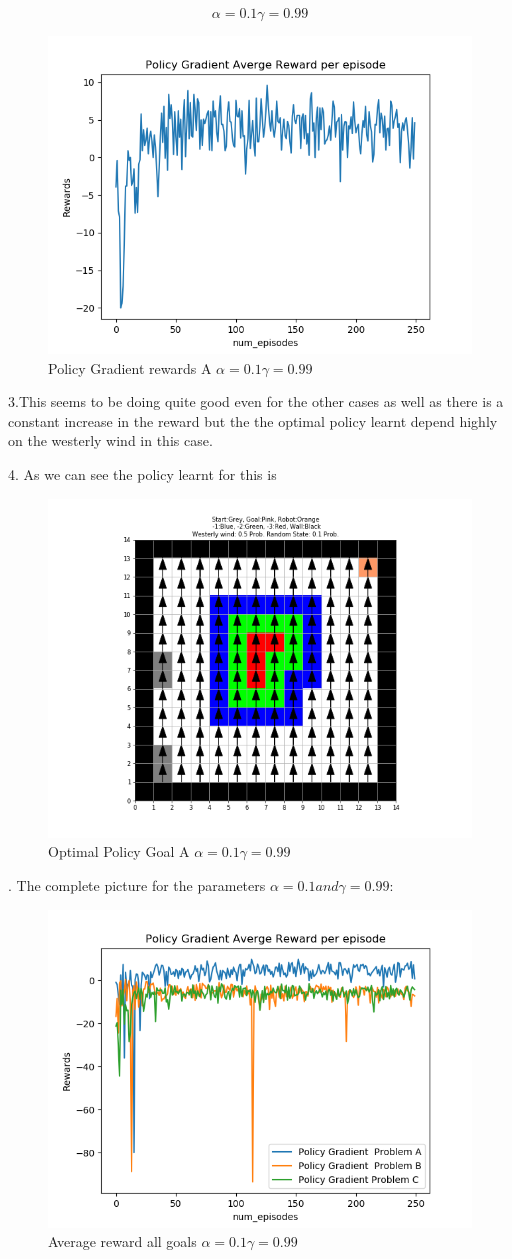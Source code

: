 \documentclass[12pt, letterpaper, twoside]{report}
\begin{document}
\[ \alpha = 0.1 \gamma = 0.99\] 
 \begin{figure}[h!]
  \centering
    \includegraphics[width=0.5\linewidth]{Policy_Gradient_Averages_steps goal a.png}
  \caption{{Policy Gradient rewards A $\alpha = 0.1 \gamma = 0.99$}}
\end{figure}

3.This seems to be doing quite good even for the other cases as well as there is a constant increase in the reward but the the optimal policy learnt depend highly on the westerly wind in this case.\newline

4. As we can see the policy learnt for this is
\begin{figure}[h!]
  \centering
    \includegraphics[width=0.5\linewidth]{Policy_Gradient__Problem_A.png}
  \caption{Optimal Policy Goal A $\alpha = 0.1 \gamma = 0.99$}
\end{figure}. The complete picture for the parameters $\alpha = 0.1 and \gamma = 0.99$:
\begin{figure}[h!]
  \centering
    \includegraphics[width=0.5\linewidth]{jhblseriuglh.png}
  \caption{Average reward all goals $\alpha = 0.1 \gamma = 0.99$}
\end{figure}
\end{document}
